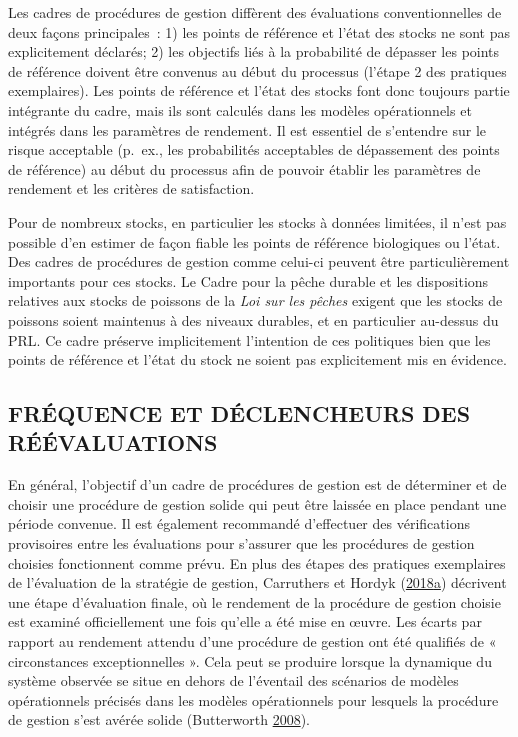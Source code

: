 \documentclass[french,11pt]{book}
\begin{document}
Les cadres de procédures de gestion diffèrent des évaluations conventionnelles de deux façons principales~: 1) les points de référence et l'état des stocks ne sont pas explicitement déclarés; 2) les objectifs liés à la probabilité de dépasser les points de référence doivent être convenus au début du processus (l'étape 2 des pratiques exemplaires). Les points de référence et l'état des stocks font donc toujours partie intégrante du cadre, mais ils sont calculés dans les modèles opérationnels et intégrés dans les paramètres de rendement. Il est essentiel de s'entendre sur le risque acceptable (p.~ex., les probabilités acceptables de dépassement des points de référence) au début du processus afin de pouvoir établir les paramètres de rendement et les critères de satisfaction.

Pour de nombreux stocks, en particulier les stocks à données limitées, il n'est pas possible d'en estimer de façon fiable les points de référence biologiques ou l'état. Des cadres de procédures de gestion comme celui-ci peuvent être particulièrement importants pour ces stocks. Le Cadre pour la pêche durable et les dispositions relatives aux stocks de poissons de la \emph{Loi sur les pêches} exigent que les stocks de poissons soient maintenus à des niveaux durables, et en particulier au-dessus du PRL. Ce cadre préserve implicitement l'intention de ces politiques bien que les points de référence et l'état du stock ne soient pas explicitement mis en évidence.

\hypertarget{sec:discussion-triggers}{%
\subsection{FRÉQUENCE ET DÉCLENCHEURS DES RÉÉVALUATIONS}\label{sec:discussion-triggers}}

En général, l'objectif d'un cadre de procédures de gestion est de déterminer et de choisir une procédure de gestion solide qui peut être laissée en place pendant une période convenue. Il est également recommandé d'effectuer des vérifications provisoires entre les évaluations pour s'assurer que les procédures de gestion choisies fonctionnent comme prévu. En plus des étapes des pratiques exemplaires de l'évaluation de la stratégie de gestion, Carruthers et Hordyk (\protect\hyperlink{ref-carruthers2018}{2018}\protect\hyperlink{ref-carruthers2018}{a}) décrivent une étape d'évaluation finale, où le rendement de la procédure de gestion choisie est examiné officiellement une fois qu'elle a été mise en œuvre. Les écarts par rapport au rendement attendu d'une procédure de gestion ont été qualifiés de « circonstances exceptionnelles ». Cela peut se produire lorsque la dynamique du système observée se situe en dehors de l'éventail des scénarios de modèles opérationnels précisés dans les modèles opérationnels pour lesquels la procédure de gestion s'est avérée solide (Butterworth \protect\hyperlink{ref-butterworth2008}{2008}).
\end{document}
